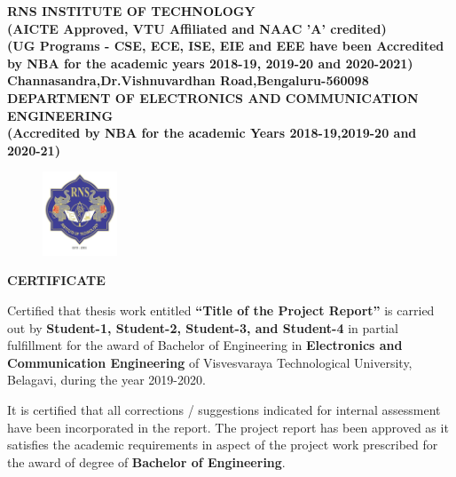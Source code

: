\setlength{\toptafiddle}{1in}
\setlength{\bottafiddle}{1in}
\vspace*{-0.5in}
\enlargethispage{\bottafiddle}
\thispagestyle{empty}


\begin{center}
\small\textbf{	RNS INSTITUTE OF TECHNOLOGY\\
(AICTE Approved, VTU Affiliated and NAAC 'A' credited)\\
(UG Programs - CSE, ECE, ISE, EIE and EEE have been Accredited by NBA for the academic years 2018-19, 2019-20 and 2020-2021)\\
Channasandra,Dr.Vishnuvardhan Road,Bengaluru-560098}\\
\vspace{0.3cm}
\scriptsize\textbf{DEPARTMENT OF ELECTRONICS AND COMMUNICATION ENGINEERING}\\
\small\textbf{(Accredited by NBA for the academic Years 2018-19,2019-20 and 2020-21)
}
\end{center}

\begin{center}
\begin{figure}[h]
\centering
\includegraphics[height=2.5cm]{images/rns1.jpg}
\end{figure}
\Large{\textbf{CERTIFICATE}}
\end{center}

Certified that thesis work entitled \textbf{``Title of the Project Report''} is carried out by \textbf{Student-1, Student-2, Student-3, and Student-4} in partial fulfillment for the award of Bachelor of Engineering in \textbf{\color{blue}Electronics and Communication Engineering} of Visvesvaraya Technological University, Belagavi, during the year 2019-2020. 


It is certified that all corrections / suggestions indicated for internal assessment have been incorporated in the report. The project report has been approved as it satisfies the academic requirements in aspect of the project work prescribed for the award of degree of \textbf{\color{blue}Bachelor of Engineering}.

